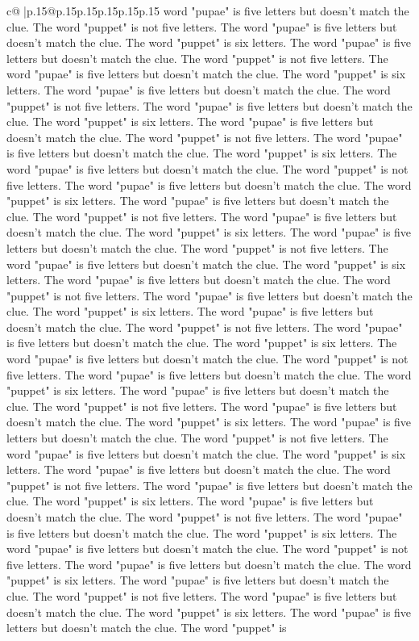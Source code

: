 \documentclass{article}
\begin{document}
{\begin{supertabular}{c@{$\;$}|p{.15\linewidth}@{}p{.15\linewidth}p{.15\linewidth}p{.15\linewidth}p{.15\linewidth}p{.15\linewidth}}
{{{word "pupae" is five letters but doesn't match the clue. The word "puppet" is not five letters. The word "pupae" is five letters but doesn't match the clue. The word "puppet" is six letters. The word "pupae" is five letters but doesn't match the clue. The word "puppet" is not five letters. The word "pupae" is five letters but doesn't match the clue. The word "puppet" is six letters. The word "pupae" is five letters but doesn't match the clue. The word "puppet" is not five letters. The word "pupae" is five letters but doesn't match the clue. The word "puppet" is six letters. The word "pupae" is five letters but doesn't match the clue. The word "puppet" is not five letters. The word "pupae" is five letters but doesn't match the clue. The word "puppet" is six letters. The word "pupae" is five letters but doesn't match the clue. The word "puppet" is not five letters. The word "pupae" is five letters but doesn't match the clue. The word "puppet" is six letters. The word "pupae" is five letters but doesn't match the clue. The word "puppet" is not five letters. The word "pupae" is five letters but doesn't match the clue. The word "puppet" is six letters. The word "pupae" is five letters but doesn't match the clue. The word "puppet" is not five letters. The word "pupae" is five letters but doesn't match the clue. The word "puppet" is six letters. The word "pupae" is five letters but doesn't match the clue. The word "puppet" is not five letters. The word "pupae" is five letters but doesn't match the clue. The word "puppet" is six letters. The word "pupae" is five letters but doesn't match the clue. The word "puppet" is not five letters. The word "pupae" is five letters but doesn't match the clue. The word "puppet" is six letters. The word "pupae" is five letters but doesn't match the clue. The word "puppet" is not five letters. The word "pupae" is five letters but doesn't match the clue. The word "puppet" is six letters. The word "pupae" is five letters but doesn't match the clue. The word "puppet" is not five letters. The word "pupae" is five letters but doesn't match the clue. The word "puppet" is six letters. The word "pupae" is five letters but doesn't match the clue. The word "puppet" is not five letters. The word "pupae" is five letters but doesn't match the clue. The word "puppet" is six letters. The word "pupae" is five letters but doesn't match the clue. The word "puppet" is not five letters. The word "pupae" is five letters but doesn't match the clue. The word "puppet" is six letters. The word "pupae" is five letters but doesn't match the clue. The word "puppet" is not five letters. The word "pupae" is five letters but doesn't match the clue. The word "puppet" is six letters. The word "pupae" is five letters but doesn't match the clue. The word "puppet" is not five letters. The word "pupae" is five letters but doesn't match the clue. The word "puppet" is six letters. The word "pupae" is five letters but doesn't match the clue. The word "puppet" is not five letters. The word "pupae" is five letters but doesn't match the clue. The word "puppet" is six letters. The word "pupae" is five letters but doesn't match the clue. The word "puppet" is }}}
\end{supertabular}}
\end{document}

